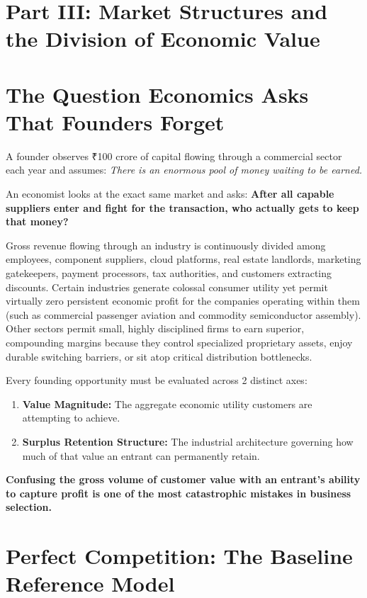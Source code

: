 \section*{Part III: Market Structures and the Division of Economic Value}

\section{The Question Economics Asks That Founders Forget}

A founder observes ₹100 crore of capital flowing through a commercial sector each year and assumes: \textit{There is an enormous pool of money waiting to be earned.}

An economist looks at the exact same market and asks: \textbf{After all capable suppliers enter and fight for the transaction, who actually gets to keep that money?}

Gross revenue flowing through an industry is continuously divided among employees, component suppliers, cloud platforms, real estate landlords, marketing gatekeepers, payment processors, tax authorities, and customers extracting discounts. Certain industries generate colossal consumer utility yet permit virtually zero persistent economic profit for the companies operating within them (such as commercial passenger aviation and commodity semiconductor assembly). Other sectors permit small, highly disciplined firms to earn superior, compounding margins because they control specialized proprietary assets, enjoy durable switching barriers, or sit atop critical distribution bottlenecks.

Every founding opportunity must be evaluated across 2 distinct axes:
\begin{enumerate}[leftmargin=12pt,itemsep=1pt,topsep=1pt,parsep=0pt]
  \item \textbf{Value Magnitude:} The aggregate economic utility customers are attempting to achieve.
  \item \textbf{Surplus Retention Structure:} The industrial architecture governing how much of that value an entrant can permanently retain.
\end{enumerate}

\textbf{Confusing the gross volume of customer value with an entrant's ability to capture profit is one of the most catastrophic mistakes in business selection.}

\section{Perfect Competition: The Baseline Reference Model}

